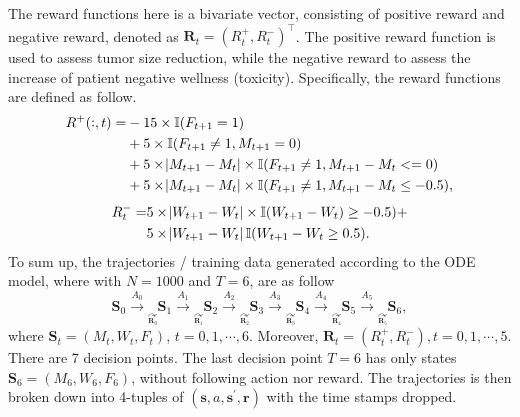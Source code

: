 \documentclass{article}
\newcommand{\p}{\prime}
\newcommand{\bs}{ \boldsymbol}
\newcommand{\mb}{\mathbb}
\begin{document}
The reward functions here is a bivariate vector, consisting of positive reward and negative reward, denoted as $\boldsymbol{R}_t = ( R^+_t , R^-_t )^\intercal$. The positive reward function is used to assess tumor size reduction, while the negative reward to assess the increase of patient negative wellness (toxicity). Specifically, the reward functions are defined as follow. 
\begin{equation}
\begin{split}
R^{+}(:, t)  =  &  -15 \times \mb{I}( F_{ t+1} = 1) \\
& + 5 \times \mb{I}(  F_{ t+1 } \neq 1 , M_{ t+1} = 0 )   \\
&  + 5 \times \abs{ M_{t+1} - M_{t} } \times \mb{I}(  F_{ t+1} \neq 1, M_{ t+1 } - M_{t} <= 0  ) \\
& + 5 \times \abs{ M_{ t+1} - M_{t} } \times \mb{I}(  F_{ t+1 } \neq  1 , M_{t+1} - M_t \leq -0.5 ),
\end{split}
\end{equation}
\begin{equation}
\begin{split}
R^{-}_t = & 5 \times \abs{ W_{t+1} - W_{t} }  \times \mb{I} ( W_{t+1} - W_t) \ge -0.5 ) + \\
 & 5 \times \abs{ W_{ t+1} - W_{t} } \mb{I}( W_{t+1} - W_{t} \ge 0.5 ).
\end{split}
\end{equation}
To sum up, the trajectories / training data generated according to the ODE model, where with $N = 1000$ and $T = 6$, are as follow
$$\bs{S}_0 \overset{A_0}{\longrightarrow}\underset{\underset{\bs{R}_0}{\curvearrowright}}\, \bs{S}_1 \overset{A_1}{\longrightarrow} \underset{\underset{\bs{R}_1}{\curvearrowright}}\, \bs{S}_2 \overset{A_2}{\longrightarrow} \underset{\underset{\bs{R}_2}{\curvearrowright}}\,  \bs{S}_3 \overset{A_3}{\longrightarrow} \underset{\underset{\bs{R}_3}{\curvearrowright}}\,  \bs{S}_4 \overset{A_4}{\longrightarrow}  \underset{\underset{\bs{R}_4}{\curvearrowright}}\, \bs{S}_5 \overset{A_5}{\longrightarrow} \underset{\underset{\bs{R}_5}{\curvearrowright}}\,  \bs{S}_6, $$
where $\bs{S}_t = (M_t, W_t, F_t)$, $t = 0, 1, \cdots, 6$. Moreover, $\bs{R}_{t} = (R_t^+, R_t^-), t = 0, 1, \cdots, 5$. There are 7 decision points. The last decision point $T = 6$ has only states $\bs{S}_6 = (M_6, W_6, F_6)$, without following action nor reward. The trajectories is then broken down into 4-tuples of $(\bs{s}, a, \bs{s}^{\p}, \bs{r})$ with the time stamps dropped.
\end{document}
